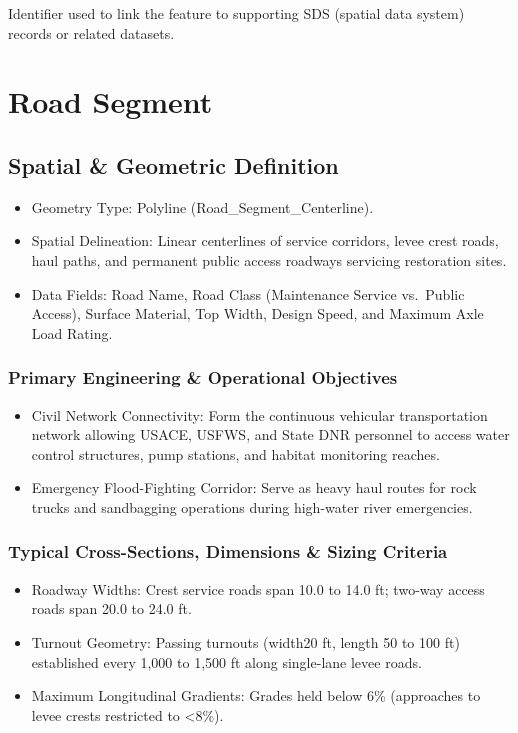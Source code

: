 \documentclass[
  letterpaper,
  DIV=11,
  numbers=noendperiod]{scrreprt}
\begin{document}
Identifier used to link the feature to supporting SDS (spatial data
system) records or related datasets.

\chapter{Road Segment}\label{road-segment}

\section{Spatial \& Geometric
Definition}\label{spatial-geometric-definition-23}

\begin{itemize}
\item
  Geometry Type: Polyline (Road\_Segment\_Centerline).
\item
  Spatial Delineation: Linear centerlines of service corridors, levee
  crest roads, haul paths, and permanent public access roadways
  servicing restoration sites.
\item
  Data Fields: Road Name, Road Class (Maintenance Service vs.~Public
  Access), Surface Material, Top Width, Design Speed, and Maximum Axle
  Load Rating.
\end{itemize}

\subsection{Primary Engineering \& Operational
Objectives}\label{primary-engineering-operational-objectives-4}

\begin{itemize}
\item
  Civil Network Connectivity: Form the continuous vehicular
  transportation network allowing USACE, USFWS, and State DNR personnel
  to access water control structures, pump stations, and habitat
  monitoring reaches.
\item
  Emergency Flood-Fighting Corridor: Serve as heavy haul routes for rock
  trucks and sandbagging operations during high-water river emergencies.
\end{itemize}

\subsection{Typical Cross-Sections, Dimensions \& Sizing
Criteria}\label{typical-cross-sections-dimensions-sizing-criteria-12}

\begin{itemize}
\item
  Roadway Widths: Crest service roads span 10.0 to 14.0 ft; two-way
  access roads span 20.0 to 24.0 ft.
\item
  Turnout Geometry: Passing turnouts (width20 ft, length 50 to 100 ft)
  established every 1,000 to 1,500 ft along single-lane levee roads.
\item
  Maximum Longitudinal Gradients: Grades held below 6\% (approaches to
  levee crests restricted to \textless8\%).
\end{itemize}
\end{document}

